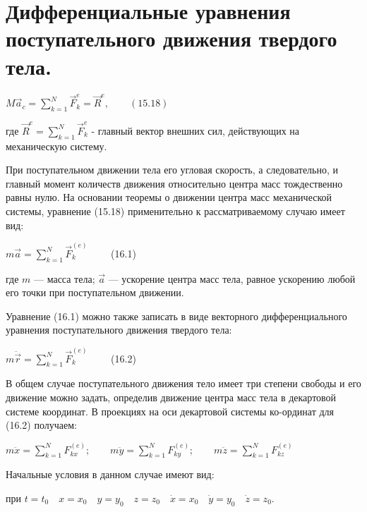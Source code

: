 {%
\section{Дифференциальные уравнения поступательного движения твердого тела.}
\begin{center}
    \par \par $M \vec a_c = \sum\limits_{k=1}^N \vec F_k^e = \vec R^e, \qquad(15.18)$

    \par где $ \vec R^e = \sum\limits_{k=1}^N \vec F_k^e$ - главный вектор внешних сил, действующих на механическую систему.
    
    \par При поступательном движении тела его угловая скорость, а следовательно, и главный момент количеств  движения относительно центра масс тождественно равны нулю. На основании теоремы о движении центра масс механической системы, уравнение (15.18) применительно к рассматриваемому случаю имеет вид:

    \par $m \vec a = \sum\limits_{k=1}^N \vec F_k^{(e)} \qquad$ (16.1)

    \par где $m$ — масса тела;  $\vec{a}$  — ускорение центра масс тела, равное ускорению любой его точки при поступательном движении.

    \par Уравнение (16.1) можно также записать в виде векторного дифференциального уравнения поступательного движения твердого тела:

    \par $m \ddot{\vec r} = \sum\limits_{k=1}^N \vec F_k^{(e)} \qquad$ (16.2)

    \par В общем случае поступательного движения тело имеет три степени свободы и его движение можно задать, определив движение центра масс тела в декартовой системе координат. В проекциях на оси декартовой системы ко-ординат для (16.2) получаем:

    \par $m \ddot{x} = \sum\limits_{k=1}^N F_{kx}^{(e)}; \qquad 
    m \ddot{y} = \sum\limits_{k=1}^N F_{ky}^{(e)}; \qquad 
    m \ddot{z} = \sum\limits_{k=1}^N F_{kz}^{(e)}$

    \par Начальные условия в данном случае имеют вид:

    \par при $t = t_0 \quad x = x_0 \quad y = y_0 \quad z = z_0 \quad \dot{x} = x_0 \quad \dot{y} = y_0 \quad \dot{z} = z_0.$


\end{center}}
